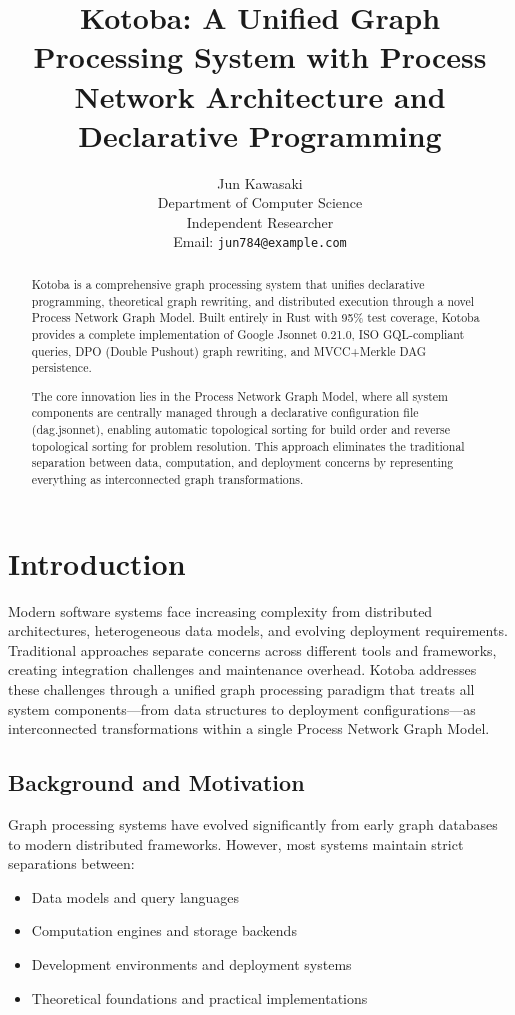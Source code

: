 \documentclass[11pt,a4paper]{article}
\title{Kotoba: A Unified Graph Processing System with Process Network Architecture and Declarative Programming}
\author{
Jun Kawasaki \\
Department of Computer Science \\
Independent Researcher \\
Email: \texttt{jun784@example.com}
}
\begin{document}
\maketitle

\begin{abstract}
Kotoba is a comprehensive graph processing system that unifies declarative programming, theoretical graph rewriting, and distributed execution through a novel Process Network Graph Model. Built entirely in Rust with 95\% test coverage, Kotoba provides a complete implementation of Google Jsonnet 0.21.0, ISO GQL-compliant queries, DPO (Double Pushout) graph rewriting, and MVCC+Merkle DAG persistence.

The core innovation lies in the Process Network Graph Model, where all system components are centrally managed through a declarative configuration file (dag.jsonnet), enabling automatic topological sorting for build order and reverse topological sorting for problem resolution. This approach eliminates the traditional separation between data, computation, and deployment concerns by representing everything as interconnected graph transformations.
\end{abstract}

\section{Introduction}
\label{sec:introduction}

Modern software systems face increasing complexity from distributed architectures, heterogeneous data models, and evolving deployment requirements. Traditional approaches separate concerns across different tools and frameworks, creating integration challenges and maintenance overhead. Kotoba addresses these challenges through a unified graph processing paradigm that treats all system components---from data structures to deployment configurations---as interconnected transformations within a single Process Network Graph Model.

\subsection{Background and Motivation}
\label{subsec:background}

Graph processing systems have evolved significantly from early graph databases to modern distributed frameworks. However, most systems maintain strict separations between:
\begin{itemize}
\item Data models and query languages
\item Computation engines and storage backends
\item Development environments and deployment systems
\item Theoretical foundations and practical implementations
\end{itemize}
\end{document}
